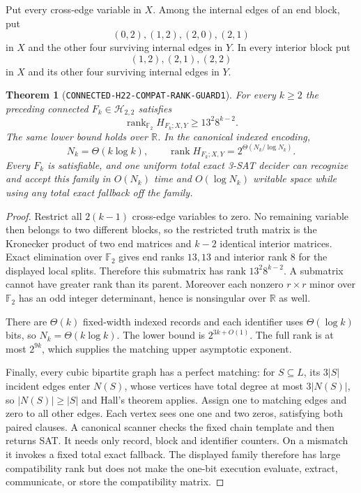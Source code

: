\documentclass[11pt]{article}
\newtheorem{theorem}{Theorem}
\newcommand{\Htwo}{\mathcal H_{2,2}}
\begin{document}
Put every cross-edge variable in $X$.  Among the internal edges of an end
block, put
\[
 (0,2),(1,2),(2,0),(2,1)
\]
in $X$ and the other four surviving internal edges in $Y$.  In every
interior block put
\[
 (1,2),(2,1),(2,2)
\]
in $X$ and its other four surviving internal edges in $Y$.

\begin{theorem}[\texttt{CONNECTED-H22-COMPAT-RANK-GUARD1}]
For every $k\ge2$ the preceding connected $F_k\in\Htwo$ satisfies
\[
 \operatorname{rank}_{\mathbb F_2}H_{F_k;X,Y}
 \ge 13^2 8^{k-2}.
\]
The same lower bound holds over $\mathbb R$.  In the canonical indexed
encoding,
\[
 N_k=\Theta(k\log k),\qquad
 \operatorname{rank}H_{F_k;X,Y}=2^{\Theta(N_k/\log N_k)}.
\]
Every $F_k$ is satisfiable, and one uniform total exact 3-SAT decider can
recognize and accept this family in $O(N_k)$ time and $O(\log N_k)$ writable
space while using any total exact fallback off the family.
\end{theorem}

\begin{proof}
Restrict all $2(k-1)$ cross-edge variables to zero.  No remaining variable
then belongs to two different blocks, so the restricted truth matrix is the
Kronecker product of two end matrices and $k-2$ identical interior matrices.
Exact elimination over $\mathbb F_2$ gives end ranks $13,13$ and interior
rank $8$ for the displayed local splits.  Therefore this submatrix has rank
$13^2 8^{k-2}$.  A submatrix cannot have greater rank than its parent.
Moreover each nonzero $r\times r$ minor over $\mathbb F_2$ has an odd
integer determinant, hence is nonsingular over $\mathbb R$ as well.

There are $\Theta(k)$ fixed-width indexed records and each identifier uses
$\Theta(\log k)$ bits, so $N_k=\Theta(k\log k)$.  The lower bound is
$2^{3k+O(1)}$.  The full rank is at most $2^{9k}$, which supplies the matching
upper asymptotic exponent.

Finally, every cubic bipartite graph has a perfect matching: for
$S\subseteq L$, its $3|S|$ incident edges enter $N(S)$, whose vertices have
total degree at most $3|N(S)|$, so $|N(S)|\ge|S|$ and Hall's theorem applies.
Assign one to matching edges and zero to all other edges.  Each vertex sees
one one and two zeros, satisfying both paired clauses.  A canonical scanner
checks the fixed chain template and then returns SAT.  It needs only record,
block and identifier counters.  On a mismatch it invokes a fixed total exact
fallback.  The displayed family therefore has large compatibility rank but
does not make the one-bit execution evaluate, extract, communicate, or store
the compatibility matrix.
\end{proof}
\end{document}
